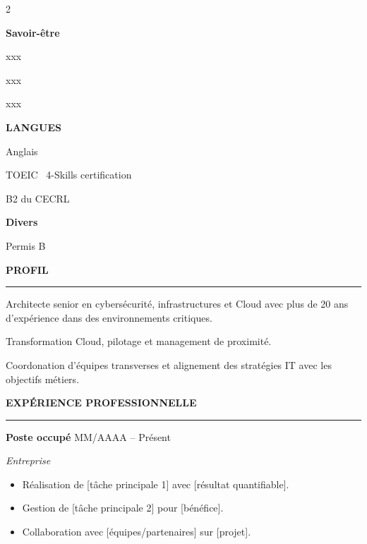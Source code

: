 \documentclass[11pt,a4paper]{article}
\begin{document}
\begin{paracol}{2}
\begin{leftcolumn}
{{      \vspace{10pt}
      {\large\textbf{Savoir-être}}\par
      \hrulefill\par
      \vspace{5pt}
      xxx\par
      xxx\par
      xxx\par

      \vspace{10pt}
      {\large\textbf{LANGUES}}\par
      \hrulefill\par
      \vspace{5pt}
      Anglais\par
      TOEIC \textregistered~4-Skills certification\par
      B2 du CECRL\par

      \vspace{10pt}
      {\large\textbf{Divers}}\par
      \hrulefill\par
      \vspace{5pt}
      Permis B\par
      \vspace{10pt}
    }%
  }%
\end{leftcolumn}

\switchcolumn
  {\large\textbf{PROFIL}}\par
  {\color{accentcolor}\rule{\linewidth}{1pt}}\par
  \vspace{5pt}
  {\raggedright\small\textcolor{darktext}{Architecte senior en cybersécurité, infrastructures et Cloud avec plus de 20 ans d’expérience dans des environnements critiques.\par
  Transformation Cloud, pilotage et management de proximité.\par
  Coordonation d'équipes transverses et alignement des stratégies IT avec les objectifs métiers.}}\par

  \vspace{10pt}
  {\large\textbf{EXPÉRIENCE PROFESSIONNELLE}}\par
  {\color{accentcolor}\rule{\linewidth}{1pt}}\par
  \vspace{5pt}

  \textbf{Poste occupé} \hfill MM/AAAA – Présent\par
  \textit{Entreprise}\par
  \begin{itemize}
    \item Réalisation de [tâche principale 1] avec [résultat quantifiable].
    \item Gestion de [tâche principale 2] pour [bénéfice].
    \item Collaboration avec [équipes/partenaires] sur [projet].
  \end{itemize}


\end{paracol}
\end{document}
